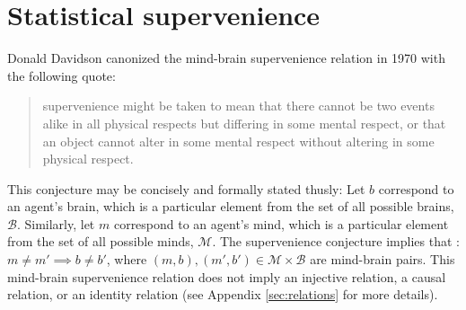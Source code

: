 \documentclass{article}
\newcommand{\mB}{\mathcal{B}}
\newcommand{\mM}{\mathcal{M}}
\providecommand{\mc}[1]{\mathcal{#1}}
\begin{document}


\section{Statistical supervenience} %
\label{sec:preliminaries}



Donald Davidson canonized the mind-brain supervenience relation in 1970 with the following quote: \cite{Davidson70}
\begin{quotation}
\noindent supervenience might be taken to mean that there cannot be two events alike in all physical respects but differing in some mental respect, or that an object cannot alter in some mental respect without altering in some physical respect.
\end{quotation}
This conjecture may be concisely and formally stated thusly: Let $b$ correspond to an agent's brain, which is a particular element from the set of all possible brains, $\mB$. %
Similarly, let $m$ correspond to an agent's mind, which is a particular element from the set of all possible minds, $\mM$.  %
The supervenience conjecture implies that%
: $m \neq m' \implies b \neq b'$, where $(m,b), (m',b') \in \mc{M} \times \mc{B}$ are mind-brain pairs.  This mind-brain supervenience relation does not imply an injective relation, a causal relation, or an identity relation (see Appendix \ref{sec:relations} for more details).
\end{document}
